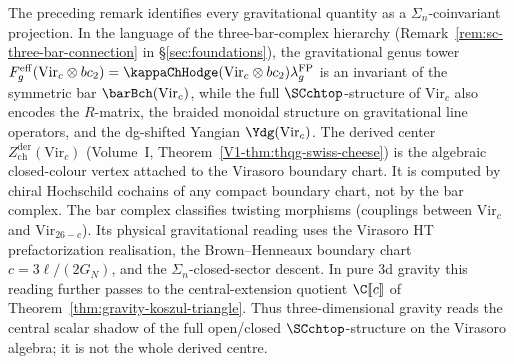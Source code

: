 \begin{remark}
\label{rem:gravity-sigma-descent}%
%
%
The preceding remark identifies every gravitational quantity as
a $\Sigma_n$-coinvariant projection. In the language of the
three-bar-complex hierarchy
(Remark~\ref{rem:sc-three-bar-connection} in
\S\ref{sec:foundations}), the gravitational genus tower
$F_g^{\mathrm{eff}}(\mathrm{Vir}_c \otimes bc_2)
= \kappaChHodge(\mathrm{Vir}_c \otimes bc_2)
\lambda_g^{\mathrm{FP}}$ is an invariant of the symmetric bar $\barBch(\mathrm{Vir}_c)$,
while the full $\SCchtop$-structure of $\mathrm{Vir}_c$
also encodes the $R$-matrix, the braided monoidal
structure on gravitational line operators, and the dg-shifted
Yangian $\Ydg(\mathrm{Vir}_c)$.
The derived center $Z^{\mathrm{der}}_{\mathrm{ch}}(\mathrm{Vir}_c)$
(Volume~I, Theorem~\ref*{V1-thm:thqg-swiss-cheese}) is the
algebraic closed-colour vertex attached to the Virasoro boundary
chart. It is computed by chiral Hochschild cochains of any compact
boundary chart, not by the bar complex.
The bar complex classifies twisting morphisms (couplings between
$\mathrm{Vir}_c$ and $\mathrm{Vir}_{26-c}$). Its physical
gravitational reading uses the Virasoro HT prefactorization
realisation, the Brown--Henneaux boundary chart
\(c=3\ell/(2G_N)\), and the \(\Sigma_n\)-closed-sector descent.
In pure 3d gravity this reading further passes to the
central-extension quotient \(\C[\![c]\!]\) of
Theorem~\ref{thm:gravity-koszul-triangle}. Thus three-dimensional
gravity reads the central scalar shadow of the full open/closed
$\SCchtop$-structure on the Virasoro algebra; it is not the whole
derived centre.
\end{remark}

